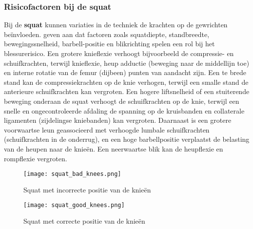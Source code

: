 \subsubsection{Risicofactoren bij de squat}
\label{subsubsec:risicofactoren-squat}
Bij de \textbf{squat} kunnen variaties in de techniek de krachten op de gewrichten beïnvloeden. 
\textcite{BengtssonEtAl2018} geven aan dat factoren zoals squatdiepte, standbreedte, bewegingssnelheid, barbell-positie en blikrichting spelen een rol bij het blessurerisico. 
Een grotere knieflexie verhoogt bijvoorbeeld de compressie- en schuifkrachten, terwijl knieflexie, heup adductie (beweging naar de middellijn toe) en interne rotatie van de femur (dijbeen) punten van aandacht zijn.
Een te brede stand kan de compressiekrachten op de knie verhogen, terwijl een smalle stand de anterieure schuifkrachten kan vergroten. 
Een hogere liftsnelheid of een stuiterende beweging onderaan de squat verhoogt de schuifkrachten op de knie, terwijl een snelle en ongecontroleerde afdaling de spanning op de kruisbanden en collaterale ligamenten (zijdelingse kniebanden) kan vergroten. 
Daarnaast is een grotere voorwaartse leun geassocieerd met verhoogde lumbale schuifkrachten (schuifkrachten in de onderrug), en een hoge barbellpositie verplaatst de belasting van de heupen naar de knieën. 
Een neerwaartse blik kan de heupflexie en rompflexie vergroten.

\begin{figure}[h]
  \centering
  \begin{minipage}{0.45\textwidth}
      \centering
      \texttt{[image: squat\_bad\_knees.png]}
      \caption[Figuur 1]{\label{fig:squat_incorrect}Squat met incorrecte positie van de knieën \autocite{CzaprowskiEtAl2012}}
  \end{minipage}
  \hfill %
  \begin{minipage}{0.45\textwidth}
      \centering
      \texttt{[image: squat\_good\_knees.png]}
      \caption[Figuur 2]{\label{fig:squat_correct}Squat met correcte positie van de knieën\autocite{ComfortEtAl2018}}
  \end{minipage}
\end{figure}

